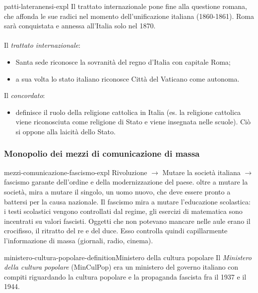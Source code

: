 \documentclass[preview]{standalone}
\begin{document}
\begin{snippet}{patti-lateranensi-expl}
    Il trattato internazionale pone fine alla questione romana, che affonda
    le sue radici nel momento dell'unificazione italiana (1860-1861).
    Roma sarà conquistata e annessa all'Italia solo nel 1870.
    \\\\
    Il \textit{trattato internazionale}:
    \begin{itemize}
        \item Santa sede riconosce la sovranità del regno d'Italia con capitale Roma;
        \item a sua volta lo stato italiano riconosce Città del Vaticano come autonoma.
    \end{itemize}
    Il \textit{concordato}:
    \begin{itemize}
        \item definisce il ruolo della religione cattolica in Italia (es. la religione cattolica
        viene riconosciuta come religione di Stato e viene insegnata nelle scuole).
        Ciò si oppone alla laicità dello Stato.
    \end{itemize}
\end{snippet}

\subsubsection{Monopolio dei mezzi di comunicazione di massa}

\begin{snippet}{mezzi-comunicazione-fascismo-expl}
    Rivoluzione \(\rightarrow\) Mutare la società italiana \(\rightarrow\) fascismo garante
    dell'ordine e della modernizzazione del paese.
    oltre a mutare la società, mira a mutare il singolo, un uomo nuovo, che deve
    essere pronto a battersi per la causa nazionale.
    Il fascismo mira a mutare l'educazione scolastica: i testi scolastici
    vengono controllati dal regime, gli esercizi di matematica sono incentrati
    su valori fascisti. Oggetti che non potevano mancare nelle aule erano il crocifisso,
    il ritratto del re e del duce.
    Esso controlla quindi capillarmente l'informazione di massa (giornali, radio,
    cinema).
\end{snippet}

\begin{snippetdefinition}{ministero-cultura-popolare-definition}{Ministero della cultura popolare}
    Il \textit{Ministero della cultura popolare} (MinCulPop) era un ministero
    del governo italiano con compiti riguardando la cultura popolare
    e la propaganda fascista fra il 1937 e il 1944.
\end{snippetdefinition}
\end{document}
